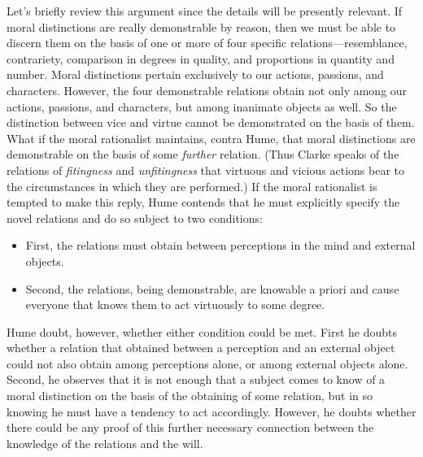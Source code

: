 Let's briefly review this argument since the details will be presently relevant. If moral distinctions are really demonstrable by reason, then we must be able to discern them on the basis of one or more of four specific relations---resemblance, contrariety, comparison in degrees in quality, and proportions in quantity and number. Moral distinctions pertain exclusively to our actions, passions, and characters. However, the four demonstrable relations obtain not only among our actions, passions, and characters, but among inanimate objects as well. So the distinction between vice and virtue cannot be demonstrated on the basis of them. What if the moral rationalist maintains, contra Hume, that moral distinctions are demonstrable on the basis of some \emph{further} relation. (Thus Clarke speaks of the relations of \emph{fitingness} and \emph{unfitingness} that virtuous and vicious actions bear to the circumstances in which they are performed.) If the moral rationalist is tempted to make this reply, Hume contends that he must explicitly specify the novel relations and do so subject to two conditions:
\begin{itemize}
    \item First, the relations must obtain between perceptions in the mind and external objects.
    \item Second, the relations, being demonstrable, are knowable a priori and cause everyone that knows them to act virtuously to some degree.
\end{itemize}
Hume doubt, however, whether either condition could be met. First he doubts whether a relation that obtained between a perception and an external object could not also obtain among perceptions alone, or among external objects alone. Second, he observes that it is not enough that a subject comes to know of a moral distinction on the basis of the obtaining of some relation, but in so knowing he must have a tendency to act accordingly. However, he doubts whether there could be any proof of this further necessary connection between the knowledge of the relations and the will.

% 

